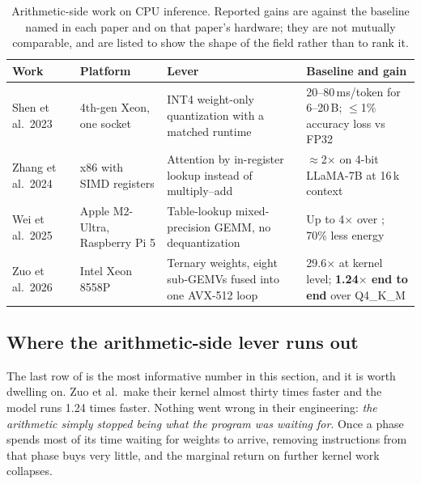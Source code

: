 \begin{table}[htbp]
\centering
\small
\tabsetup
\caption{Arithmetic-side work on CPU inference.  Reported gains are
against the baseline named in each paper and on that paper's hardware;
they are not mutually comparable, and are listed to show the shape of
the field rather than to rank it.}
\label{tab:lit-arithmetic}
\begin{tabularx}{\textwidth}{@{}P{2.5cm}P{3.1cm}YP{3.1cm}@{}}
\toprule
\headrow
\textbf{Work} & \textbf{Platform} & \textbf{Lever} &
\textbf{Baseline and gain} \\
\midrule
Shen et al.\ 2023~\cite{shen2023efficientcpu}
& 4th-gen Xeon, one socket
& INT4 weight-only quantization with a matched runtime
& 20--80\,ms/token for 6--20\,B; \(\leq\)1\% accuracy loss vs FP32 \\
\addlinespace[2pt]
Zhang et al.\ 2024~\cite{zhang2024nomad}
& x86 with SIMD registers
& Attention by in-register lookup instead of multiply--add
& \(\approx\)2$\times$ on 4-bit LLaMA-7B at 16\,k context \\
\addlinespace[2pt]
Wei et al.\ 2025~\cite{wei2025tmac}
& Apple M2-Ultra, Raspberry Pi 5
& Table-lookup mixed-precision GEMM, no dequantization
& Up to 4$\times$ over \lcpp{}; 70\% less energy \\
\addlinespace[2pt]
Zuo et al.\ 2026~\cite{zuo2026fairyfuse}
& Intel Xeon 8558P
& Ternary weights, eight sub-GEMVs fused into one AVX-512 loop
& 29.6$\times$ at kernel level; \textbf{1.24$\times$ end to end} over
  \lcpp{} Q4\_K\_M \\
\bottomrule
\end{tabularx}
\end{table}

\subsection{Where the arithmetic-side lever runs out}
\label{sec:lit-pivot}

The last row of  is the most informative
number in this section, and it is worth dwelling on.  Zuo et al.\ make
their kernel almost thirty times faster and the model runs 1.24 times
faster.  Nothing went wrong in their engineering: \emph{the arithmetic simply
stopped being what the program was waiting for}.  Once a phase spends
most of its time waiting for weights to arrive, removing instructions
from that phase buys very little, and the marginal return on further
kernel work collapses.

